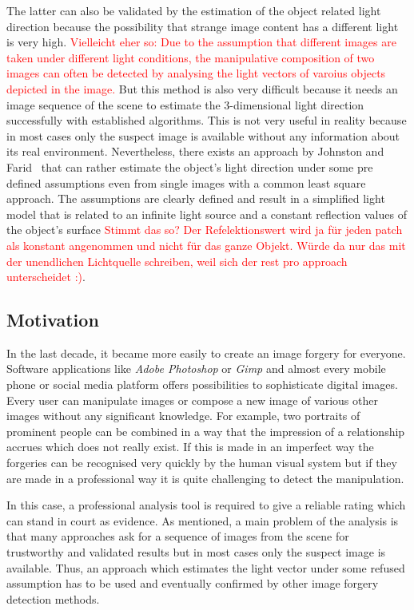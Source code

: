 The latter can also be validated by the estimation of the object related light direction because the possibility that strange image content has a different light is very high. \textcolor{red}{Vielleicht eher so: Due to the assumption that different images are taken under different light conditions, the manipulative composition of two images can often be detected by analysing the light vectors of varoius objects depicted in the image.} But this method is also very difficult because it needs an image sequence of the scene to estimate the 3-dimensional light direction successfully with established algorithms. This is not very useful in reality because in most cases only the suspect image is available without any information about its real environment. Nevertheless, there exists an approach by Johnston and Farid~\cite{Johnson} that can rather estimate the object's light direction under some pre defined assumptions even from single images with a common least square approach. The assumptions are clearly defined and result in a simplified light model that is related to an infinite light source and a constant reflection values of the object's surface \textcolor{red}{Stimmt das so? Der Refelektionswert wird ja für jeden patch als konstant angenommen und nicht für das ganze Objekt. Würde da nur das mit der unendlichen Lichtquelle schreiben, weil sich der rest pro approach unterscheidet :)}.

\subsection{Motivation}\label{sec:Motivation}
In the last decade, it became more easily to create an image forgery for everyone. Software applications like \textit{Adobe Photoshop} or \textit{Gimp} and almost every mobile phone or social media platform offers possibilities to sophisticate digital images. Every user can manipulate images or compose a new image of various other images without any significant knowledge. For example, two portraits of prominent people can be combined in a way that the impression of a relationship accrues which does not really exist. If this is made in an imperfect way the forgeries can be recognised very quickly by the human visual system but if they are made in a professional way it is quite challenging to detect the manipulation. 

In this case, a professional analysis tool is required to give a reliable rating which can stand in court as evidence. As mentioned, a main problem of the analysis is that many approaches ask for a sequence of images from the scene for trustworthy and validated results but in most cases only the suspect image is available. Thus, an approach which estimates the light vector under some refused assumption has to be used and eventually confirmed by other image forgery detection methods. 

